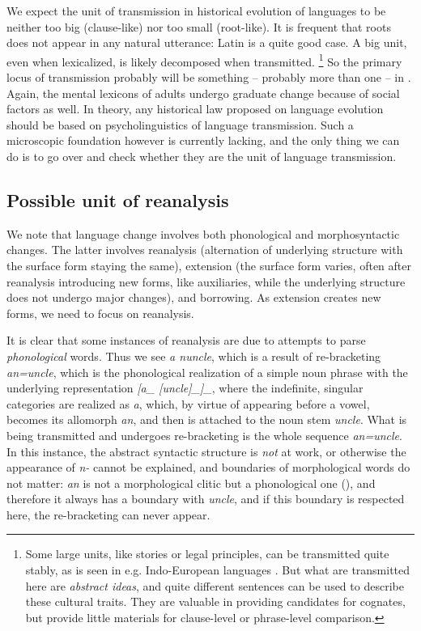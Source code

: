\documentclass[a4paper, oneside, scheme=plain, 12pt]{article}
\newcommand*{\citechap}[1]{Ch.~{#1}}
\newcommand{\form}[1]{\emph{#1}}
\newcommand*{\category}[1]{\textsc{#1}}
\begin{document}
We expect the unit of transmission in historical evolution of languages
to be neither too big (clause-like) nor too small (root-like).
It is frequent that roots does not appear in any natural utterance:
Latin is a quite good case.
A big unit, even when lexicalized, is likely decomposed when transmitted.%
\footnote{
    Some large units, like stories or legal principles, can be transmitted quite stably,
    as is seen in e.g. Indo-European languages \citep[\citechap{2}]{fortson2011indo}.
    But what are transmitted here are \emph{abstract ideas},
    and quite different sentences can be used to describe these cultural traits.
    They are valuable in providing candidates for cognates,
    but provide little materials for clause-level or phrase-level comparison.
}
So the primary locus of transmission probably will be something -- probably more than one -- in .
Again, the mental lexicons of adults undergo graduate change because of social factors as well.
In theory, any historical law proposed on language evolution 
should be based on psycholinguistics of language transmission.
Such a microscopic foundation however is currently lacking,
and the only thing we can do is to go over 
and check whether they are the unit of language transmission.

\subsection{Possible unit of reanalysis}

We note that language change involves both phonological and morphosyntactic changes.
The latter involves reanalysis (alternation of underlying structure with the surface form staying the same), extension (the surface form varies, often after reanalysis introducing new forms, like auxiliaries, while the underlying structure does not undergo major changes), and borrowing.
As extension creates new forms, we need to focus on reanalysis.

It is clear that some instances of reanalysis are due to attempts to parse \emph{phonological} words. 
Thus we see \form{a nuncle}, which is a result of re-bracketing \form{an=uncle},
which is the phonological realization of a simple noun phrase with the underlying representation
\form{[a_{\text{\category{singular,indefinite}}} [uncle]_{\text{noun stem}}]_{\text{noun phrase}}},
where the indefinite, singular categories are realized as \form{a},
which, by virtue of appearing before a vowel, becomes its allomorph \form{an},
and then is attached to the noun stem \form{uncle}.
What is being transmitted and undergoes re-bracketing is the whole sequence \form{an=uncle}.
In this instance, the abstract syntactic structure is \emph{not} at work,
or otherwise the appearance of \form{n-} cannot be explained,
and boundaries of morphological words do not matter:
\form{an} is not a morphological clitic but a phonological one (),
and therefore it always has a boundary with \form{uncle},
and if this boundary is respected here, the re-bracketing can never appear.
\end{document}
